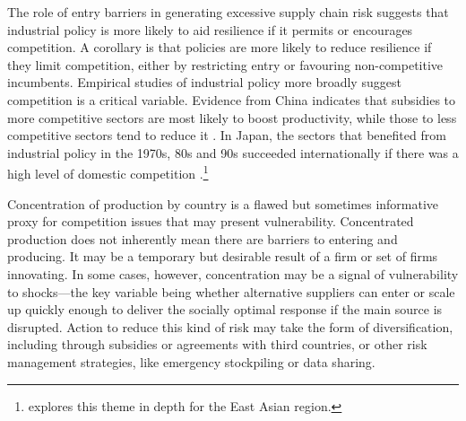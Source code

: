 \documentclass{article}
\begin{document}
The role of entry barriers in generating excessive supply chain risk suggests that industrial policy is more likely to aid resilience if it permits or encourages competition. A corollary is that policies are more likely to reduce resilience if they limit competition, either by restricting entry or favouring non-competitive incumbents. Empirical studies of industrial policy more broadly suggest competition is a critical variable. Evidence from China indicates that subsidies to more competitive sectors are most likely to boost productivity, while those to less competitive sectors tend to reduce it \parencite{aghion_industrial_2015}. In Japan, the sectors that benefited from industrial policy in the 1970s, 80s and 90s succeeded internationally if there was a high level of domestic competition \parencite{porter_competition_2004}.\footnote{\textcite{studwell_how_2014} explores this theme in depth for the East Asian region.}

Concentration of production by country is a flawed but sometimes informative proxy for competition issues that may present vulnerability. Concentrated production does not inherently mean there are barriers to entering and producing. It may be a temporary but desirable result of a firm or set of firms innovating. In some cases, however, concentration may be a signal of vulnerability to shocks---the key variable being whether alternative suppliers can enter or scale up quickly enough to deliver the socially optimal response if the main source is disrupted. Action to reduce this kind of risk may take the form of diversification, including through subsidies or agreements with third countries, or other risk management strategies, like emergency stockpiling or data sharing.
\end{document}
